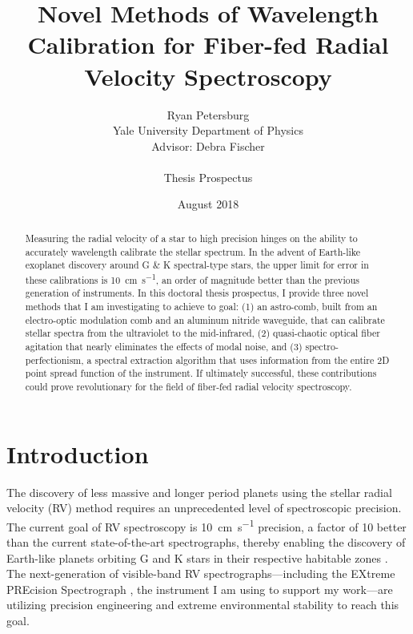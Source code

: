 \documentclass[11pt]{article}
\title{Novel Methods of Wavelength Calibration for Fiber-fed Radial Velocity Spectroscopy}
\author{Ryan Petersburg\\
Yale University Department of Physics\\
Advisor: Debra Fischer\\
\\
Thesis Prospectus}
\date{August 2018}
\begin{document}
\maketitle

\begin{abstract}

Measuring the radial velocity of a star to high precision hinges on the ability to accurately wavelength calibrate the stellar spectrum. In the advent of Earth-like exoplanet discovery around G \& K spectral-type stars, the upper limit for error in these calibrations is \SI{10}{\centi\meter\per\second}, an order of magnitude better than the previous generation of instruments. In this doctoral thesis prospectus, I provide three novel methods that I am investigating to achieve to goal: (1) an astro-comb, built from an electro-optic modulation comb and an aluminum nitride waveguide, that can calibrate stellar spectra from the ultraviolet to the mid-infrared, (2) quasi-chaotic optical fiber agitation that nearly eliminates the effects of modal noise, and (3) spectro-perfectionism, a spectral extraction algorithm that uses information from the entire 2D point spread function of the instrument. If ultimately successful, these contributions could prove revolutionary for the field of fiber-fed radial velocity spectroscopy.

\end{abstract}

\pagebreak

\section{Introduction}

The discovery of less massive and longer period planets using the stellar radial velocity (RV) method requires an unprecedented level of spectroscopic precision. The current goal of RV spectroscopy is \SI{10}{\centi\meter\per\second} precision, a factor of 10 better than the current state-of-the-art spectrographs, thereby enabling the discovery of Earth-like planets orbiting G and K stars in their respective habitable zones \citep{Fischer2016}. The next-generation of visible-band RV spectrographs---including the EXtreme PREcision Spectrograph \citep[EXPRES;][]{Jurgenson2016}, the instrument I am using to support my work---are utilizing precision engineering and extreme environmental stability to reach this goal.
\end{document}
